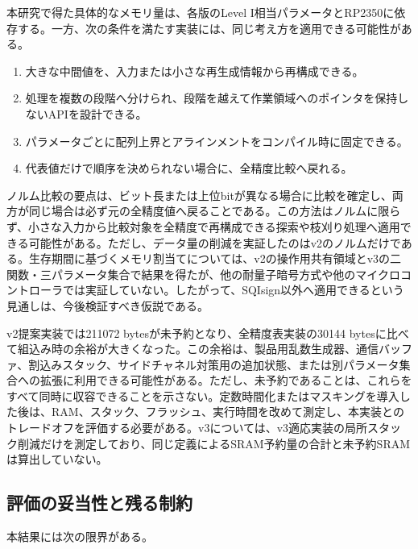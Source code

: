 \documentclass[a4paper,10pt]{ltjsarticle}
\theoremstyle{definition}
\theoremstyle{remark}
\begin{document}
本研究で得た具体的なメモリ量は、各版のLevel I相当パラメータとRP2350に依存する。一方、次の条件を満たす実装には、同じ考え方を適用できる可能性がある。

\begin{enumerate}[leftmargin=2.2em]
  \item 大きな中間値を、入力または小さな再生成情報から再構成できる。
  \item 処理を複数の段階へ分けられ、段階を越えて作業領域へのポインタを保持しないAPIを設計できる。
  \item パラメータごとに配列上界とアラインメントをコンパイル時に固定できる。
  \item 代表値だけで順序を決められない場合に、全精度比較へ戻れる。
\end{enumerate}

ノルム比較の要点は、ビット長または上位bitが異なる場合に比較を確定し、両方が同じ場合は必ず元の全精度値へ戻ることである。この方法はノルムに限らず、小さな入力から比較対象を全精度で再構成できる探索や枝刈り処理へ適用できる可能性がある。ただし、データ量の削減を実証したのはv2のノルムだけである。生存期間に基づくメモリ割当てについては、v2の操作用共有領域とv3の二関数・三パラメータ集合で結果を得たが、他の耐量子暗号方式や他のマイクロコントローラでは実証していない。したがって、SQIsign以外へ適用できるという見通しは、今後検証すべき仮説である。

v2提案実装では\num{211072} bytesが未予約となり、全精度表実装の\num{30144} bytesに比べて組込み時の余裕が大きくなった。この余裕は、製品用乱数生成器、通信バッファ、割込みスタック、サイドチャネル対策用の追加状態、または別パラメータ集合への拡張に利用できる可能性がある。ただし、未予約であることは、これらをすべて同時に収容できることを示さない。定数時間化またはマスキングを導入した後は、RAM、スタック、フラッシュ、実行時間を改めて測定し、本実装とのトレードオフを評価する必要がある。v3については、v3適応実装の局所スタック削減だけを測定しており、同じ定義によるSRAM予約量の合計と未予約SRAMは算出していない。

\subsection{評価の妥当性と残る制約}
\label{sec:limitations}

本結果には次の限界がある。
\end{document}
